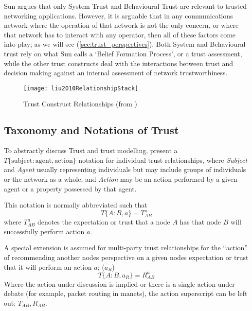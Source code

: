 Sun argues that only System Trust and Behavioural Trust are relevant to trusted networking applications.
However, it is arguable that in any communications network where the operation of that network is not the only concern, or where that network has to interact with any operator, then all of these factors come into play; as we will see (\autoref{sec:trust_perspectives}).
Both System and Behavioural trust rely on what Sun calls a ‘Belief Formation Process’, or a trust assessment, while the other trust constructs deal with the interactions between trust and decision making against an internal assessment of network trustworthiness.

\begin{figure}
	\centering
	\texttt{[image: liu2010RelationshipStack]}
	\caption[Trust Construct Relationships]{Trust Construct Relationships (from \citet{Liu2010})}
	\label{fig:trust_constructs}
\end{figure}


\subsection{Taxonomy and Notations of Trust}\label{sec:trust_taxonomy}

To abstractly discuss Trust and trust modelling, \citet{Liu2006} present a $T\{\text{subject}:\text{agent},\text{action}\}$ notation for individual trust relationships, where \emph{Subject} and \emph{Agent} usually representing individuals but may include groups of individuals or the network as a whole, and \emph{Action} may be an action performed by a given agent or a property possessed by that agent.

This notation is normally abbreviated such that 
\begin{equation}
  \label{eq:trust_notation}
  T\{A:B,a\} = T^a_{AB}
\end{equation} 
where $T^a_{AB}$ denotes the expectation or trust that a node $A$ has that node $B$ will successfully perform action $a$.

A special extension is assumed for multi-party trust relationships for the ``action'' of recommending another nodes perspective on a given nodes expectation or trust that it will perform an action $a$; ($a_R$)
%
\begin{equation}
  \label{eq:recommendation_notation}
  T\{A:B,a_R\} = R^a_{AB}
\end{equation}
%
Where the action under discussion is implied or there is a single action under debate (for example, packet routing in \glspl{manet}), the action superscript can be left out; $T_{AB} , R_{AB}$.

